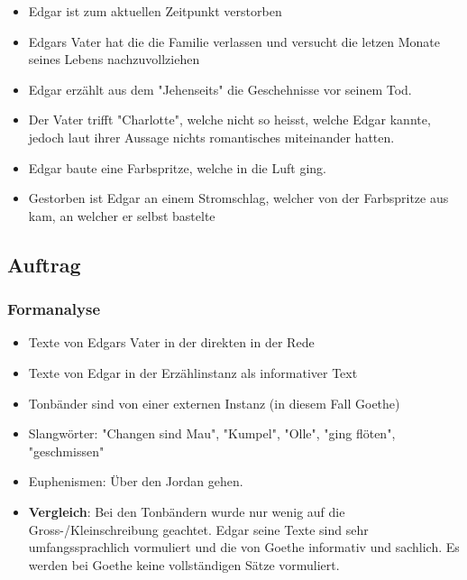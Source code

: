 \documentclass{article}
\begin{document}
\begin{itemize}[parsep=0pt]
    \item Edgar ist zum aktuellen Zeitpunkt verstorben
    \item Edgars Vater hat die die Familie verlassen und versucht die letzen Monate seines Lebens nachzuvollziehen
    \item Edgar erzählt aus dem "Jehenseits" die Geschehnisse vor seinem Tod.
    \item Der Vater trifft "Charlotte", welche nicht so heisst, welche Edgar kannte, jedoch laut ihrer Aussage nichts romantisches miteinander hatten.
    \item Edgar baute eine Farbspritze, welche in die Luft ging.
    \item Gestorben ist Edgar an einem Stromschlag, welcher von der Farbspritze aus kam, an welcher er selbst bastelte
\end{itemize}

\newpage
\subsection{Auftrag}
\subsubsection{Formanalyse}
\begin{itemize}[parsep=0pt]
    \item Texte von Edgars Vater in der direkten in der Rede
    \item Texte von Edgar in der Erzählinstanz als informativer Text
    \item Tonbänder sind von einer externen Instanz (in diesem Fall Goethe)
    \item Slangwörter: "Changen sind Mau", "Kumpel", "Olle", "ging flöten", "geschmissen"
    \item Euphenismen: Über den Jordan gehen.
    \item \textbf{Vergleich}: Bei den Tonbändern wurde nur wenig auf die Gross-/Kleinschreibung geachtet. Edgar seine Texte sind sehr umfangssprachlich vormuliert und die von Goethe informativ und sachlich. Es werden bei Goethe keine vollständigen Sätze vormuliert.
\end{itemize}
\end{document}
